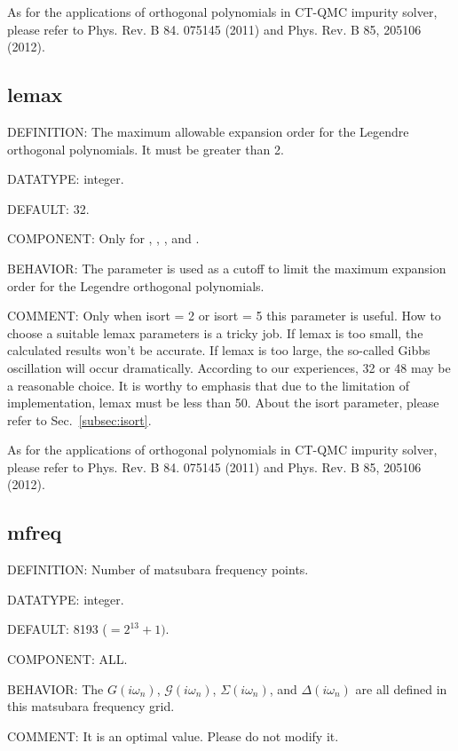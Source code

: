 As for the applications of orthogonal polynomials in CT-QMC impurity solver, please refer to Phys. Rev. B 84. 075145 (2011) and Phys. Rev. B 85, 205106 (2012). 

\subsection{lemax}
{\color{red}DEFINITION:} The maximum allowable expansion order for the Legendre orthogonal polynomials. It must be greater than 2.

{\color{green}DATATYPE:} integer.

{\color{blue}DEFAULT:} 32.

{\color{brown}COMPONENT:} Only for {\gardenia}, {\narcissus}, {\lavender}, and {\manjushaka}.

{\color{purple}BEHAVIOR:} The parameter is used as a cutoff to limit the maximum expansion order for the Legendre orthogonal polynomials.

{\color{olive}COMMENT:} Only when isort = 2 or isort = 5 this parameter is useful. How to choose a suitable lemax parameters is a tricky job. If lemax is too small, the calculated results won't be accurate. If lemax is too large, the so-called Gibbs oscillation will occur dramatically. According to our experiences, 32 or 48 may be a reasonable choice. It is worthy to emphasis that due to the limitation of implementation, lemax must be less than 50. About the isort parameter, please refer to Sec.~\ref{subsec:isort}.

As for the applications of orthogonal polynomials in CT-QMC impurity solver, please refer to Phys. Rev. B 84. 075145 (2011) and Phys. Rev. B 85, 205106 (2012).


\subsection{mfreq}
{\color{red}DEFINITION:} Number of matsubara frequency points.

{\color{green}DATATYPE:} integer.

{\color{blue}DEFAULT:} 8193 ($ = 2^{13} + 1)$.

{\color{brown}COMPONENT:} ALL.

{\color{purple}BEHAVIOR:} The $G(i\omega_n)$, $\mathcal{G}(i\omega_n)$, $\Sigma(i\omega_n)$, and $\Delta(i\omega_n)$ are all defined in this matsubara frequency grid.

{\color{olive}COMMENT:} It is an optimal value. Please do not modify it.

